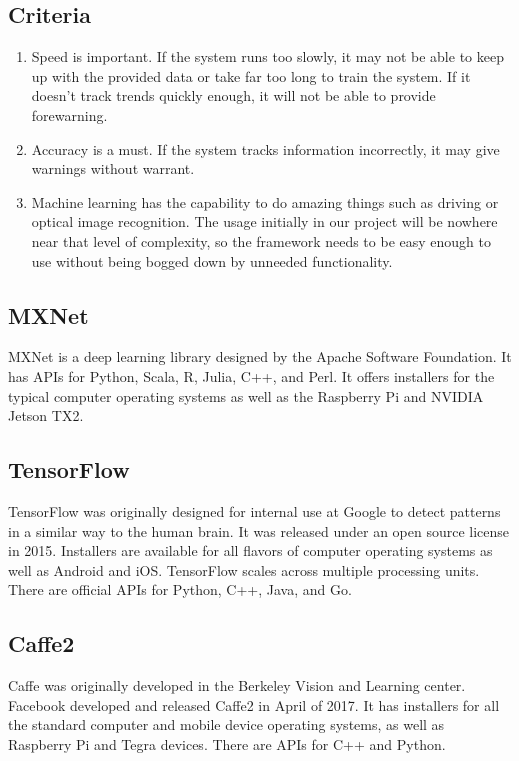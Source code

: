 \documentclass[letterpaper,10pt,onecolumn]{IEEEtran}
\begin{document}
  \subsection {Criteria}
    \begin{enumerate}
      \item Speed is important. If the system runs too slowly, it may not be able to keep up with the provided data or take far too long to train the system. If it doesn't track trends quickly enough, it will not be able to provide forewarning.
      \item Accuracy is a must. If the system tracks information incorrectly, it may give warnings without warrant.
	  \item Machine learning has the capability to do amazing things such as driving or optical image recognition. The usage initially in our project will be nowhere near that level of complexity, so the framework needs to be easy enough to use without being bogged down by unneeded functionality.
    \end{enumerate}
  \subsection {MXNet}
    MXNet is a deep learning library designed by the Apache Software Foundation. It has APIs for Python, Scala, R, Julia, C++, and Perl. It offers installers for the typical computer operating systems as well as the Raspberry Pi and NVIDIA Jetson TX2. \cite{mxnet}
  \subsection {TensorFlow}
    TensorFlow was originally designed for internal use at Google to detect patterns in a similar way to the human brain. It was released under an open source license in 2015. \cite{mapr-tensor} Installers are available for all flavors of computer operating systems as well as Android and iOS. TensorFlow scales across multiple processing units. There are official APIs for Python, C++, Java, and Go. \cite{tensor-lang} \cite{friedman_2017}
  \subsection {Caffe2}
	Caffe was originally developed in the Berkeley Vision and Learning center. Facebook developed and released Caffe2 in April of 2017. It has installers for all the standard computer and mobile device operating systems, as well as Raspberry Pi and Tegra devices. There are APIs for C++ and Python.
\end{document}
